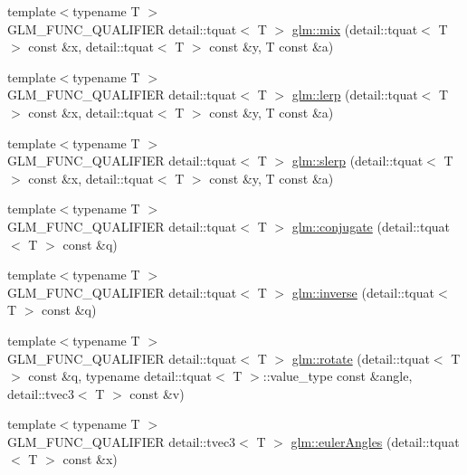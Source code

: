 \begin{DoxyCompactItemize}
\item 
{\footnotesize template$<$typename T $>$ }\\G\+L\+M\+\_\+\+F\+U\+N\+C\+\_\+\+Q\+U\+A\+L\+I\+F\+I\+E\+R detail\+::tquat$<$ T $>$ \hyperlink{group__gtc__quaternion_gaaea9592fd53952b636d680321edcdb31}{glm\+::mix} (detail\+::tquat$<$ T $>$ const \&x, detail\+::tquat$<$ T $>$ const \&y, T const \&a)
\item 
{\footnotesize template$<$typename T $>$ }\\G\+L\+M\+\_\+\+F\+U\+N\+C\+\_\+\+Q\+U\+A\+L\+I\+F\+I\+E\+R detail\+::tquat$<$ T $>$ \hyperlink{group__gtc__quaternion_ga91c6605e46a8c70c8e25bbc0f41da181}{glm\+::lerp} (detail\+::tquat$<$ T $>$ const \&x, detail\+::tquat$<$ T $>$ const \&y, T const \&a)
\item 
{\footnotesize template$<$typename T $>$ }\\G\+L\+M\+\_\+\+F\+U\+N\+C\+\_\+\+Q\+U\+A\+L\+I\+F\+I\+E\+R detail\+::tquat$<$ T $>$ \hyperlink{group__gtc__quaternion_ga5c6e56a6e55257d9fc0290df2929ec4a}{glm\+::slerp} (detail\+::tquat$<$ T $>$ const \&x, detail\+::tquat$<$ T $>$ const \&y, T const \&a)
\item 
{\footnotesize template$<$typename T $>$ }\\G\+L\+M\+\_\+\+F\+U\+N\+C\+\_\+\+Q\+U\+A\+L\+I\+F\+I\+E\+R detail\+::tquat$<$ T $>$ \hyperlink{group__gtc__quaternion_ga8b6594dffb8bf455d848ffa2169ba41d}{glm\+::conjugate} (detail\+::tquat$<$ T $>$ const \&q)
\item 
{\footnotesize template$<$typename T $>$ }\\G\+L\+M\+\_\+\+F\+U\+N\+C\+\_\+\+Q\+U\+A\+L\+I\+F\+I\+E\+R detail\+::tquat$<$ T $>$ \hyperlink{group__gtc__quaternion_ga78b87a5e7152108e0dff0855d81b3bc1}{glm\+::inverse} (detail\+::tquat$<$ T $>$ const \&q)
\item 
{\footnotesize template$<$typename T $>$ }\\G\+L\+M\+\_\+\+F\+U\+N\+C\+\_\+\+Q\+U\+A\+L\+I\+F\+I\+E\+R detail\+::tquat$<$ T $>$ \hyperlink{group__gtc__quaternion_ga297d6a9635153c76d7c011efa716b5da}{glm\+::rotate} (detail\+::tquat$<$ T $>$ const \&q, typename detail\+::tquat$<$ T $>$\+::value\+\_\+type const \&angle, detail\+::tvec3$<$ T $>$ const \&v)
\item 
{\footnotesize template$<$typename T $>$ }\\G\+L\+M\+\_\+\+F\+U\+N\+C\+\_\+\+Q\+U\+A\+L\+I\+F\+I\+E\+R detail\+::tvec3$<$ T $>$ \hyperlink{group__gtc__quaternion_gaa53e0e8933e176c6207720433fb8dd2b}{glm\+::euler\+Angles} (detail\+::tquat$<$ T $>$ const \&x)

\end{DoxyCompactItemize}
